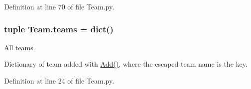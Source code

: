 Definition at line 70 of file Team.py.

\hypertarget{namespace_team_a6e402bba79c6732149986dc7571493f2}{
\subsubsection[{teams}]{\setlength{\rightskip}{0pt plus 5cm}tuple {\bf Team.teams} = dict()}}
\label{namespace_team_a6e402bba79c6732149986dc7571493f2}


All teams. 

Dictionary of team added with \hyperlink{namespace_team_ae156f7420c5c0c650a78e5eea3880645}{Add()}, where the escaped team name is the key. 

Definition at line 24 of file Team.py.

